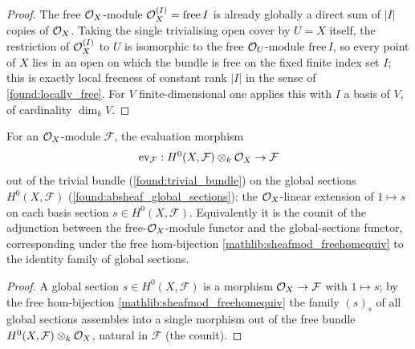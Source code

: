 \begin{proof}
  \leanok
  The free \(\mathcal{O}_X\)-module \(\mathcal{O}_X^{(I)}=\mathrm{free}\,I\) is already globally a
  direct sum of \(|I|\) copies of \(\mathcal{O}_X\).  Taking the single trivialising open
  cover by \(U=X\) itself, the restriction of \(\mathcal{O}_X^{(I)}\) to \(U\) is isomorphic
  to the free \(\mathcal{O}_U\)-module \(\mathrm{free}\,I\), so every point of \(X\) lies in
  an open on which the bundle is free on the fixed finite index set \(I\); this is
  exactly local freeness of constant rank \(|I|\) in the sense of
  \cref{found:locally_free}.  For \(V\) finite-dimensional one applies this with
  \(I\) a basis of \(V\), of cardinality \(\dim_k V\).
\end{proof}

\begin{definition}
  \label{found:eval_morphism}
  For an \(\mathcal{O}_X\)-module \(\mathcal F\), the evaluation morphism
  \[
    \mathrm{ev}_{\mathcal F}:H^0(X,\mathcal F)\otimes_k\mathcal{O}_X\to\mathcal F
  \]
  out of the trivial bundle (\cref{found:trivial_bundle}) on the global sections
  \(H^0(X,\mathcal F)\) (\cref{found:absheaf_global_sections}): the
  \(\mathcal{O}_X\)-linear extension of \(1\mapsto s\) on each basis section
  \(s\in H^0(X,\mathcal F)\).  Equivalently it is the counit of the adjunction between
  the free-\(\mathcal{O}_X\)-module functor and the global-sections functor, corresponding
  under the free hom-bijection \cref{mathlib:sheafmod_freehomequiv} to the identity
  family of global sections.
\end{definition}

\begin{proof}
  \leanok
  A global section \(s\in H^0(X,\mathcal F)\) is a morphism \(\mathcal{O}_X\to\mathcal F\)
  with \(1\mapsto s\); by the free hom-bijection \cref{mathlib:sheafmod_freehomequiv}
  the family \((s)_{s}\) of all global sections assembles into a single morphism out
  of the free bundle \(H^0(X,\mathcal F)\otimes_k\mathcal{O}_X\), natural in \(\mathcal F\)
  (the counit).
\end{proof}

